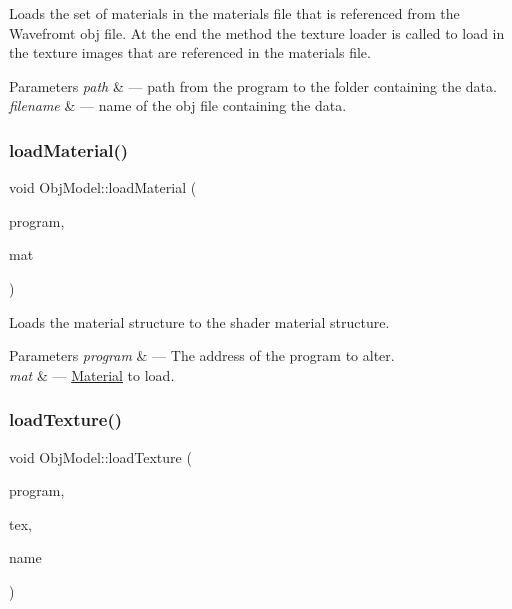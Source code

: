 Loads the set of materials in the materials file that is referenced from the Wavefromt obj file. At the end the method the texture loader is called to load in the texture images that are referenced in the materials file. 


\begin{DoxyParams}{Parameters}
{\em path} & --- path from the program to the folder containing the data.\\
\hline
{\em filename} & --- name of the obj file containing the data. \\
\hline
\end{DoxyParams}
\mbox{\label{class_obj_model_adda1040ead23e4a616c4068063f25598}} 
\subsubsection{\texorpdfstring{load\+Material()}{loadMaterial()}}
{\footnotesize\ttfamily void Obj\+Model\+::load\+Material (\begin{DoxyParamCaption}\item[{G\+Luint}]{program,  }\item[{\hyperlink{class_material}{Material}}]{mat }\end{DoxyParamCaption})}



Loads the material structure to the shader material structure. 


\begin{DoxyParams}{Parameters}
{\em program} & --- The address of the program to alter.\\
\hline
{\em mat} & --- \hyperlink{class_material}{Material} to load. \\
\hline
\end{DoxyParams}
\mbox{\label{class_obj_model_af7149df564ffbaa22bded4ba201431c7}} 
\subsubsection{\texorpdfstring{load\+Texture()}{loadTexture()}}
{\footnotesize\ttfamily void Obj\+Model\+::load\+Texture (\begin{DoxyParamCaption}\item[{G\+Luint}]{program,  }\item[{sf\+::\+Image}]{tex,  }\item[{std\+::string}]{name }\end{DoxyParamCaption})}



